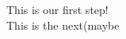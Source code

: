 \documentclass[UTF8]{ctexart}
\begin{document}
    This is our first step! \\
    This is the next(maybe
\end{document}

